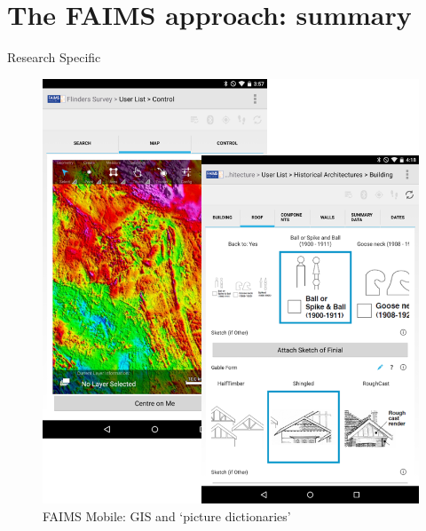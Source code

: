 \documentclass[aspectratio=169, 11pt]{beamer} %
\begin{document}

\section{The FAIMS approach: summary}

\begin{frame}{Research Specific}
 \begin{figure}[H]
    \centering
        \includegraphics[height=.75\textheight]{figures/FAIMS-screenshots.png}
        \caption{FAIMS Mobile: GIS and `picture dictionaries'}
        \label{fig:FAIMS-mobile-screenshots}
 \end{figure}
\end{frame}
\end{document}
